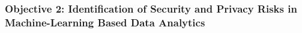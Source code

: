 \documentclass[a4paper,11pt]{article}
\newcommand{\project}[1]{\textbf{#1}\xspace}
\newcommand{\SECURITY}{\project{Security - Digital Fortress}}
\newcommand{\TheProject}{\SECURITY}
\begin{document}


\subsubsection*{Objective 2: Identification of Security and Privacy Risks in Machine-Learning Based Data Analytics}
\vspace{-6pt}
\end{document}
